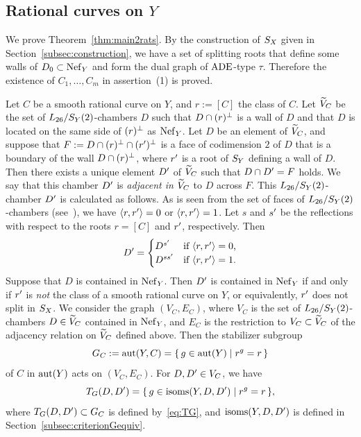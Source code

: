 \documentclass{amsart}
\numberwithin{procedure}{section}
\begin{document}
\subsection{Rational curves on $Y$}\label{subsec:Rats}
%
We prove Theorem~\ref{thm:main2rats}.
By the construction of $S_{X}$ given in Section~\ref{subsec:construction}, 
we have  a set of splitting roots that define some walls of $D_0\subset \mathord{\rm Nef}_{Y}$
and form the dual graph of $\mathord{\rm ADE}$-type $\tau$. 
Therefore the existence of $C_1, \dots, C_m$ 
in assertion~(1) is proved.
%
\par
Let $C$ be a smooth rational curve on $Y$,
and  $r:=[C]$ the class of $C$.
Let $\widetilde{V}_C$ be the set of
$L_{26}/S_Y(2)$-chambers $D$ such that
$D\cap (r)\sp{\perp}$ is a wall of $D$ and that
$D$ is located on the same side of $(r)\sp{\perp}$ as $\mathord{\rm Nef}_{Y}$.
Let $D$ be an element of $\widetilde{V}_C$,
and suppose that $F:=D\cap (r)\sp{\perp}\cap (r\sp\prime)\sp{\perp}$
is a face of codimension $2$ of $D$ that is a boundary of the wall $D\cap (r)\sp{\perp}$,
where $r\sp\prime$ is a root of $S_{Y}$ defining a wall of $D$.
Then there exists a unique element $D\sp\prime$ of $\widetilde{V}_C$
such that $D\cap D\sp\prime=F$ holds.
We say that this chamber $D\sp\prime$ is \emph{adjacent in $\widetilde{V}_C$} to $D$
across $F$.
This $L_{26}/S_Y(2)$-chamber $D\sp\prime$ is calculated as follows.
As is seen from the set of faces of $L_{26}/S_Y(2)$-chambers (see~\cite{BrandhorstShimadaCompData}),
we have $\langle r, r\sp\prime \rangle=0$ or $\langle r, r\sp\prime \rangle=1$.
Let $s$ and $s\sp\prime$ be the reflections
with respect to the roots $r=[C]$ and $r\sp\prime$,
respectively.
Then
\[
D\sp\prime=
\begin{cases}
 D^{s\sp\prime} &\textrm{if $\langle r, r\sp\prime \rangle=0$,} \\
 D^{ss\sp\prime} &\textrm{if $\langle r, r\sp\prime \rangle=1$.}
\end{cases}
\]
Suppose that $D$ is contained in $\mathord{\rm Nef}_{Y}$.
Then $D\sp\prime$ is contained in $\mathord{\rm Nef}_{Y}$ if and only if
$r\sp\prime$ is \emph{not} the class of a smooth rational curve on $Y$,
or equivalently, $r\sp\prime$ does not split in $S_{X}$.
We consider the  graph  $(V_C, E_C)$,
where
$V_C$ is the set of $L_{26}/S_Y(2)$-chambers $D\in \widetilde{V}_C$ contained in $\mathord{\rm Nef}_{Y}$,
and $E_C$  is the restriction to $V_C\subset \widetilde{V}_C$
of the adjacency relation on $\widetilde{V}_C$ defined above.
Then the stabilizer subgroup
\[
G_C:=\mathord{\rm{aut}}(Y, C)=\{\,{g\in \mathord{\rm{aut}}(Y)}\mid {r^g=r} \,\}
\]
of $C$ in $ \mathord{\rm{aut}}(Y)$
acts on $(V_C, E_C)$.
For $D, D\sp\prime\in V_C$,  we have 
\[
T_G (D, D\sp\prime)=\{\,{g\in \mathord{\rm isoms}(Y, D, D\sp\prime)}\mid { r^g=r} \,\},
\]
where 
 $T_G (D, D\sp\prime)\subset G_C$ is 
defined by~\eqref{eq:TG}, 
and $ \mathord{\rm isoms}(Y, D, D\sp\prime)$ is
defined in Section~\ref{subsec:criterionGequiv}.
\end{document}
